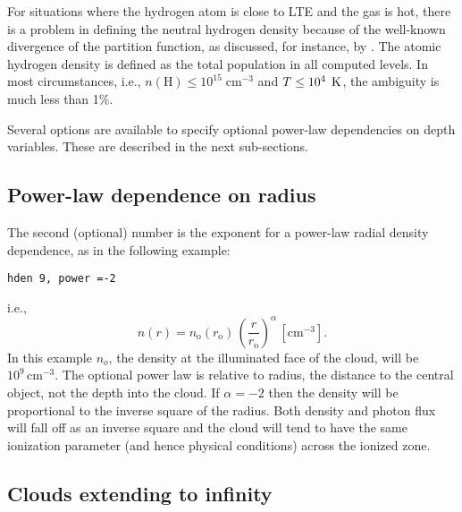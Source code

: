 For situations where the hydrogen atom is close to LTE and the gas is
hot, there is a problem in defining the neutral hydrogen density because
of the well-known divergence of the partition function, as discussed, for
instance, by \citet{Mihalas1978}.
The atomic hydrogen density is defined as
the total population in all computed levels.
In most circumstances, i.e.,
$n(\mathrm{H}) \leq 10^{15}\; \mathrm{cm}^{-3}$ and $T \le 10^4\; {\rm\thinspace K}$,
the ambiguity is much less than 1\%.

Several options are available to specify optional power-law dependencies
on depth variables.  These are described in the next sub-sections.

\subsection{Power-law dependence on radius}

The second (optional) number is the exponent  for a power-law radial
density dependence, as in the following example:
\begin{verbatim}
hden 9, power =-2
\end{verbatim}
i.e.,
\begin{equation}
n\left( r \right) = n_{\mathrm{o}} \left( {r_{\mathrm{o}} } \right)\,\left(
{\frac{r}{{r_{\mathrm{o}} }}} \right)^\alpha
\,[\mathrm{cm}^{-3}].%
\end{equation}
In this example $n_o$, the density at the illuminated face
of the cloud, will
be $10^9 \, \mathrm{cm}^{-3}$.
The optional power law is relative to radius, the distance
to the central object, not the depth into the cloud.
If $\alpha = -2$ then the
density will be proportional to the inverse square of the radius.
Both
density and photon flux will fall off as an inverse square and the cloud
will tend to have the same ionization parameter (and hence physical
conditions) across the ionized zone.

\subsection{Clouds extending to infinity}

